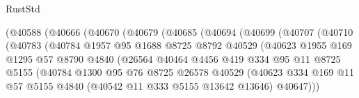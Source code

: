 \begin{lexlean}{RustStd}
\begin{coremodule}
                        (@40588
                          (@40666
                            (@40670
                              (@40679
                                (@40685
                                  (@40694
                                    (@40699
                                      (@40707
                                        (@40710
                                          (@40783
                                            (@40784
                                              @1957
                                              @95
                                              @1688
                                              @8725
                                              @8792
                                              @40529
                                              (@40623
                                                @1955
                                                @169
                                                @1295
                                                @57
                                                @8790
                                                @4840
                                                (@26564
                                                  @40464
                                                  @4456
                                                  @419
                                                  @334
                                                  @95
                                                  @11
                                                  @8725
                                                  @5155
                                                  (@40784
                                                    @1300
                                                    @95
                                                    @76
                                                    @8725
                                                    @26578
                                                    @40529
                                                    (@40623
                                                      @334
                                                      @169
                                                      @11
                                                      @57
                                                      @5155
                                                      @4840
                                                      (@40542 @11 @333 @5155 @13642 @13646)
                                                      @40647)))

\end{coremodule}
\end{lexlean}
